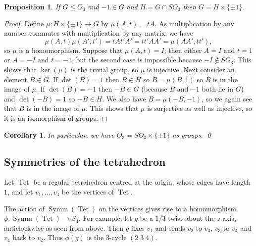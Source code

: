 \documentclass{amsart}
\DeclareMathOperator{\Tet}      {Tet}
\DeclareMathOperator{\Symm}     {Symm}
\newcommand{\tm}        {\times}
\newcommand{\xra}       {\xrightarrow}
\newcommand{\blob}      {circle(0.03cm)}
\renewcommand{\:}{\colon}
\newtheorem{proposition}[theorem]{Proposition}
\newtheorem{corollary}[theorem]{Corollary}
\theoremstyle{definition}
\begin{document}
\begin{proposition}\label{prop-product}
 If $G\leq O_3$ and $-1\in G$ and $H=G\cap SO_3$ then
 $G=H\tm\{\pm 1\}$.
\end{proposition}
\begin{proof}
 Define $\mu\:H\tm\{\pm 1\}\xra{}G$ by $\mu(A,t)=tA$.  As
 multiplication by any number commutes with multiplication by any
 matrix, we have
 \[ \mu(A,t)\mu(A',t') = tAt'A'=tt'AA'=\mu(AA',tt'), \]
 so $\mu$ is a homomorphism.  Suppose that $\mu(A,t)=I$; then
 either $A=I$ and $t=1$ or $A=-I$ and $t=-1$, but the second case is
 impossible because $-I\not\in SO_3$.  This shows that
 $\ker(\mu)$ is the trivial group, so $\mu$ is injective.  Next
 consider an element $B\in G$.  If $\det(B)=1$ then $B\in H$ so
 $B=\mu(B,1)$ so $B$ is in the image of $\mu$.  If $\det(B)=-1$ then
 $-B\in G$ (because $B$ and $-1$ both lie in $G$) and $\det(-B)=1$ so
 $-B\in H$.  We also have $B=\mu(-B,-1)$, so we again see that $B$ is
 in the image of $\mu$.  This shows that $\mu$ is surjective as well
 as injective, so it is an isomorphism of groups.
\end{proof}
\begin{corollary}
 In particular, we have $O_3=SO_3\tm\{\pm 1\}$ as groups. \qed
\end{corollary}

\subsection{Symmetries of the tetrahedron}

Let $\Tet$ be a regular tetrahedron centred at the origin, whose edges
have length $1$, and let $v_1,\ldots,v_4$ be the vertices of $\Tet$.
\begin{center}
\end{center}
The action of $\Symm(\Tet)$ on the vertices gives rise to a
homomorphism $\phi\:\Symm(\Tet)\xra{}S_4$.  For example, let $g$ be a
$1/3$-twist about the $z$-axis, anticlockwise as seen from above.
Then $g$ fixes $v_1$ and sends $v_2$ to $v_3$, $v_3$ to $v_4$ and
$v_4$ back to $v_2$.  Thus $\phi(g)$ is the $3$-cycle $(2\;3\;4)$.
\end{document}
